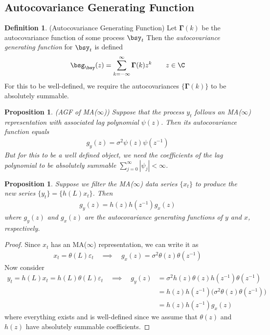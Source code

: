 \documentclass[12pt]{article}
\theoremstyle{plain}
\newtheorem{prop}[thm]{Proposition}
\theoremstyle{definition}
\newtheorem{defn}[thm]{Definition}
\theoremstyle{remark}
\newcommand{\bsGamma}{\boldsymbol{\Gamma}}
\begin{document}
\clearpage
\subsection{Autocovariance Generating Function}

\begin{defn}(Autocovariance Generating Function)
Let $\bsGamma(k)$ be the autocovariance function of some process
$\bsy_t$ Then the \emph{autocovariance generating function} for $\bsy_t$
is defined
\begin{align*}
  \bsg_{\bsy}(z)
  = \sum_{k=-\infty}^\infty \bsGamma(k)z^k
  \qquad z\in\C
\end{align*}
For this to be well-defined, we require the autocovariances
$\{\bsGamma(k)\}$ to be absolutely summable.
\end{defn}

\begin{prop}\emph{(AGF of MA($\infty$))}
Suppose that the process $y_t$ follows an MA($\infty$) representation
with associated lag polynomial $\psi(z)$.
Then its autocovariance function equals
\begin{align*}
  g_y(z) = \sigma^2 \psi(z)\psi(z^{-1})
\end{align*}
But for this to be a well defined object, we need the coefficients of
the lag polynomial to be absolutely summable
$\sum_{j=0}^\infty|\psi_j|<\infty$.
\end{prop}

\begin{prop}
Suppose we filter the MA($\infty$) data series $\{x_t\}$ to produce the
new series $\{y_t\} = \{h(L)x_t\}$. Then
\begin{align*}
  g_y(z) = h(z)h(z^{-1})g_x(z)
\end{align*}
where $g_y(z)$ and $g_x(z)$ are the autocovariance generating functions
of $y$ and $x$, respectively.
\end{prop}
\begin{proof}
Since $x_t$ has an MA($\infty$) representation, we can write it as
\begin{align*}
  x_t = \theta(L)\varepsilon_t
  \quad\implies\quad
  g_x(z) = \sigma^2 \theta(z)\theta(z^{-1})
\end{align*}
Now consider
\begin{align*}
  y_t = h(L)x_t = h(L)\theta(L)\varepsilon_t
  \quad\implies\quad
  g_y(z) &= \sigma^2 h(z)\theta(z)h(z^{-1})\theta(z^{-1})
  \\
  &= h(z)h(z^{-1})\big(\sigma^2 \theta(z)\theta(z^{-1})\big)
  \\
  &= h(z)h(z^{-1})g_x(z)
\end{align*}
where everything exists and is well-defined since we assume that
$\theta(z)$ and $h(z)$ have absolutely summable coefficients.
\end{proof}
\end{document}
